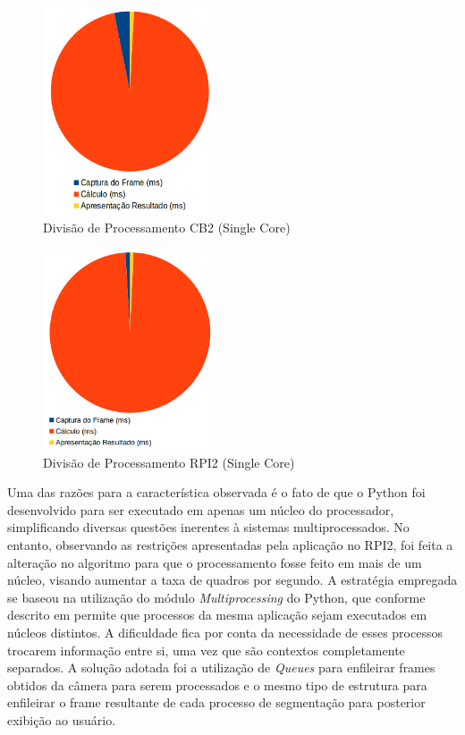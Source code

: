 \documentclass[conference]{IEEEtran}
\begin{document}
\begin{figure}[!t]
\centering
\includegraphics[width=2.0in]{Grafico_processamento_cb2_single_core}
\caption{Divisão de Processamento CB2 (Single Core)}
\label{fig:processamento_cb2}
\end{figure}

\begin{figure}[!t]
\centering
\includegraphics[width=2.0in]{Grafico_processamento_rpi2_single_core}
\caption{Divisão de Processamento RPI2 (Single Core)}
\label{fig:processamento_rpi}
\end{figure}


\newpage
Uma das razões para a característica observada é o fato de que o Python foi desenvolvido para ser executado em apenas um núcleo do processador, simplificando diversas questões inerentes à sistemas multiprocessados. No entanto, observando as restrições apresentadas pela aplicação no RPI2, foi feita a alteração no algoritmo para que o processamento fosse feito em mais de um núcleo, visando aumentar a taxa de quadros por segundo. A estratégia empregada se baseou na utilização do módulo \textit{Multiprocessing} do Python, que conforme descrito em \cite{IEEEhowto:micha} permite que processos da mesma aplicação sejam executados em núcleos distintos. A dificuldade fica por conta da necessidade de esses processos trocarem informação entre si, uma vez que são contextos completamente separados. A solução adotada foi a utilização de \textit{Queues} para enfileirar frames obtidos da câmera para serem processados e o mesmo tipo de estrutura para enfileirar o frame resultante de cada processo de segmentação para posterior exibição ao usuário. 
\end{document}
